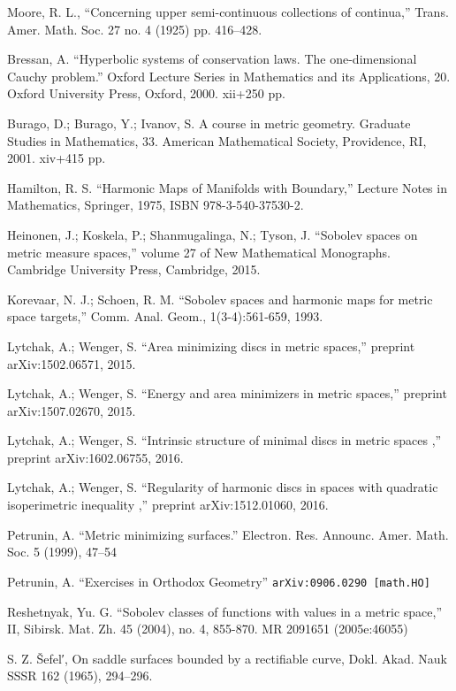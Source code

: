 \documentclass[a4paper,10pt]{amsart}
\begin{document}
\begin{thebibliography}{52}
Moore, R. L.,
``Concerning upper semi-continuous collections of continua,''
Trans. Amer. Math. Soc. 27 no. 4 (1925) pp. 416--428.

 Bressan, A.
``Hyperbolic systems of conservation laws.
The one-dimensional Cauchy problem.'' 
Oxford Lecture Series in Mathematics and its Applications, 20. 
Oxford University Press, Oxford, 2000. 
xii+250 pp.

Burago, D.; Burago, Y.; Ivanov, S.
A course in metric geometry.
Graduate Studies in Mathematics, 33. American Mathematical Society, Providence, RI, 2001. xiv+415 pp.

 Hamilton, R. S. ``Harmonic Maps of Manifolds with Boundary,'' Lecture Notes in Mathematics, Springer, 1975, ISBN 978-3-540-37530-2.

 Heinonen, J.;  Koskela, P.;  Shanmugalinga, N.; Tyson, J. ``Sobolev spaces on metric measure spaces,''
volume 27 of New Mathematical Monographs. Cambridge University Press, Cambridge, 2015.

Korevaar, N. J.; Schoen, R. M. ``Sobolev spaces and harmonic maps for metric space targets,'' Comm. Anal. Geom., 1(3-4):561-659, 1993.

Lytchak, A.; Wenger, S. ``Area minimizing discs in metric spaces,'' preprint arXiv:1502.06571, 2015.

Lytchak, A.; Wenger, S. ``Energy and area minimizers in metric spaces,'' preprint  arXiv:1507.02670, 2015.

Lytchak, A.; Wenger, S. ``Intrinsic structure of minimal discs in metric spaces ,'' preprint  arXiv:1602.06755, 2016.

Lytchak, A.; Wenger, S. ``Regularity of harmonic discs in spaces with quadratic isoperimetric inequality  ,'' preprint  arXiv:1512.01060, 2016.

 Petrunin, A.
``Metric minimizing surfaces.''
Electron. Res. Announc. Amer. Math. Soc. 5 (1999), 47--54 

 Petrunin, A. 
``Exercises in Orthodox Geometry''
{\tt arXiv:0906.0290 [math.HO]}

Reshetnyak, Yu. G. ``Sobolev classes of functions with values in a metric space,'' II, Sibirsk. Mat. Zh. 45 (2004), no. 4, 855-870. MR 2091651 (2005e:46055)

 S. Z. \v{S}efel′, On saddle surfaces bounded by a rectifiable curve, Dokl. Akad. Nauk SSSR 162 (1965), 294--296.


\end{thebibliography}
\end{document}
